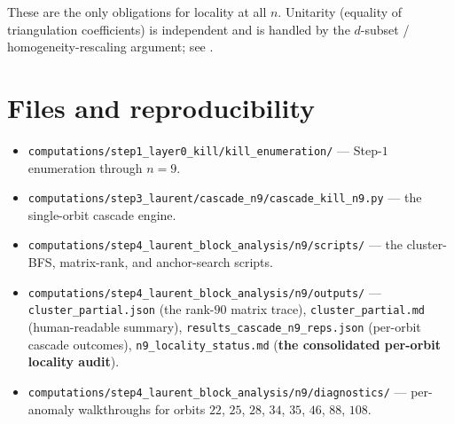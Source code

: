 \documentclass[11pt]{article}
\theoremstyle{definition}
\begin{document}
These are the only obligations for locality at all $n$. Unitarity
(equality of triangulation coefficients) is independent and is
handled by the $d$-subset / homogeneity-rescaling argument; see
\cite{notes11,notes18,subsetvan}.

\section*{Files and reproducibility}

\begin{itemize}[leftmargin=*]
\item \verb|computations/step1_layer0_kill/kill_enumeration/|
--- Step-$1$ enumeration through $n=9$.
\item \verb|computations/step3_laurent/cascade_n9/cascade_kill_n9.py|
--- the single-orbit cascade engine.
\item \verb|computations/step4_laurent_block_analysis/n9/scripts/|
--- the cluster-BFS, matrix-rank, and anchor-search scripts.
\item \verb|computations/step4_laurent_block_analysis/n9/outputs/|
--- \verb|cluster_partial.json| (the rank-$90$ matrix trace),
\verb|cluster_partial.md| (human-readable summary),
\verb|results_cascade_n9_reps.json| (per-orbit cascade outcomes),
\verb|n9_locality_status.md| (\textbf{the consolidated per-orbit
locality audit}).
\item \verb|computations/step4_laurent_block_analysis/n9/diagnostics/|
--- per-anomaly walkthroughs for orbits $22$, $25$, $28$, $34$,
$35$, $46$, $88$, $108$.
\end{itemize}
\end{document}

